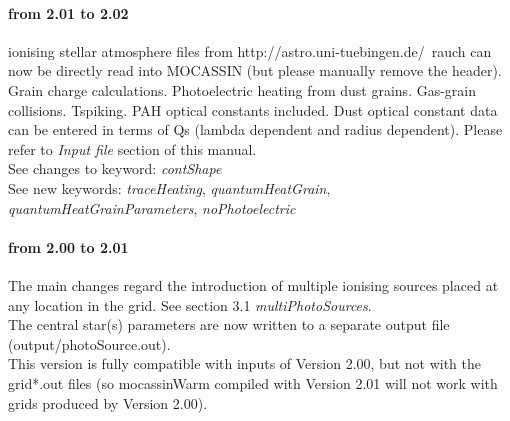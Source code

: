 \documentclass[11pt]{article}
\begin{document}
\paragraph {from 2.01 to 2.02}  ionising stellar atmosphere files from  http://astro.uni-tuebingen.de/~rauch can now be directly read into MOCASSIN (but please manually remove the header). Grain charge calculations. Photoelectric heating from dust grains. Gas-grain collisions. Tspiking. 
PAH optical constants included. Dust optical constant data can be entered in terms of Qs (lambda dependent and radius dependent).
Please refer to {\it Input file} section of this manual. \\
See changes to keyword: {\it contShape}\\
See new keywords: {\it traceHeating}, {\it quantumHeatGrain}, {\it quantumHeatGrainParameters}, 
{\it noPhotoelectric}
\\
\paragraph {from 2.00 to 2.01} The main changes regard the introduction of multiple ionising sources placed at any 
location in the grid. See section 3.1 {\it multiPhotoSources}. \\
The central star(s) parameters are now written to a separate output file (output/photoSource.out). \\
This version is fully compatible with inputs of Version 2.00, but not with the grid*.out files (so mocassinWarm compiled with Version 2.01 will not work with grids produced by Version 2.00).\\
\end{document}
